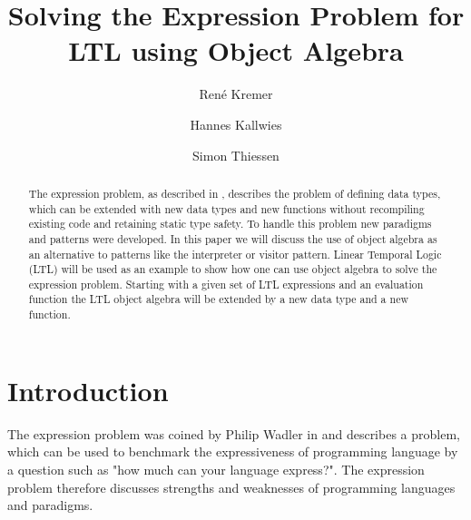 \documentclass{llncs}
\begin{document}
%
\frontmatter          %
%
\pagestyle{headings}  %
%
\mainmatter              %
%
\title{Solving the Expression Problem for LTL using Object Algebra}
%
%
\author{Ren\'e Kremer%
\and
Hannes Kallwies%
\and
Simon Thiessen%
}
%
%
%

\maketitle              %

\begin{abstract}
The expression problem, as described in \cite{wadler98}, describes the problem of defining data types, which can be extended with new data types and new functions without recompiling existing code and retaining static type safety. To handle this problem new paradigms and patterns were developed. In this paper we will discuss the use of object algebra as an alternative to patterns like the interpreter or visitor pattern. Linear Temporal Logic (LTL) \cite{pnueli77} will be used as an example to show how one can use object algebra to solve the expression problem. Starting with a given set of LTL expressions and an evaluation function the LTL object algebra will be extended by a new data type and a new function.
\end{abstract}
%
\section{Introduction} \label{sec:introduction}
The expression problem was coined by Philip Wadler in \cite{wadler98} and describes a problem, which can be used to benchmark the expressiveness of programming language by a question such as "how much can your language express?". The expression problem therefore discusses strengths and weaknesses of programming languages and paradigms.
\end{document}

